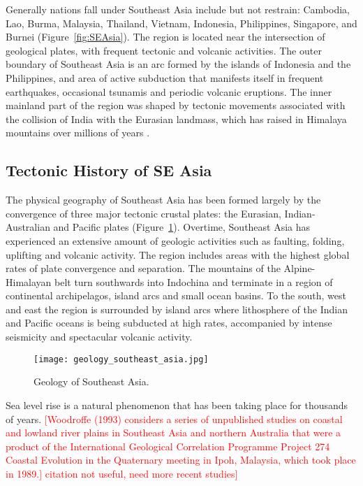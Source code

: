 Generally nations fall under Southeast Asia include but not restrain: Cambodia, Lao, Burma, Malaysia, Thailand, Vietnam, Indonesia, Philippines, Singapore, and Burnei (Figure~\ref{fig:SEAsia}). The region is located near the intersection of geological plates, with frequent tectonic and volcanic activities. The outer boundary of Southeast Asia is an arc formed by the islands of Indonesia and the Philippines, and area of active subduction that manifests itself in frequent earthquakes, occasional tsunamis and periodic volcanic eruptions. The inner mainland part of the region was shaped by tectonic movements associated with the collision of India with the Eurasian landmass, which has raised in Himalaya mountains over millions of years \citep{hirsch2016routledge}. %

\subsection{Tectonic History of SE Asia}

The physical geography of Southeast Asia has been formed largely by the convergence of three major tectonic crustal plates: the Eurasian, Indian-Australian and Pacific plates (Figure~\ref{fig:SE_asia_geology}). Overtime, Southeast Asia has experienced an extensive amount of geologic activities such as faulting, folding, uplifting and volcanic activity. The region includes areas with the highest global rates of plate convergence and separation. The mountains of the Alpine-Himalayan belt turn southwards into Indochina and terminate in a region of continental archipelagos, island arcs and small ocean basins. To the south, west and east the region is surrounded by island arcs where lithosphere of the Indian and Pacific oceans is being subducted at high rates, accompanied by intense seismicity and spectacular volcanic activity.

\begin{figure}
\centering
\texttt{[image: geology\_southeast\_asia.jpg]}
\caption{Geology of Southeast Asia.}
\label{fig:SE_asia_geology}
\end{figure}
			

Sea level rise is a natural phenomenon that has been taking place for thousands of years. \textcolor{red}{[Woodroffe (1993) considers a series of unpublished studies on coastal and lowland river plains in Southeast Asia and northern Australia that were a product of the International Geological Correlation Programme Project 274 Coastal Evolution in the Quaternary meeting in Ipoh, Malaysia, which took place in 1989.] citation not useful, need more recent studies]} 

